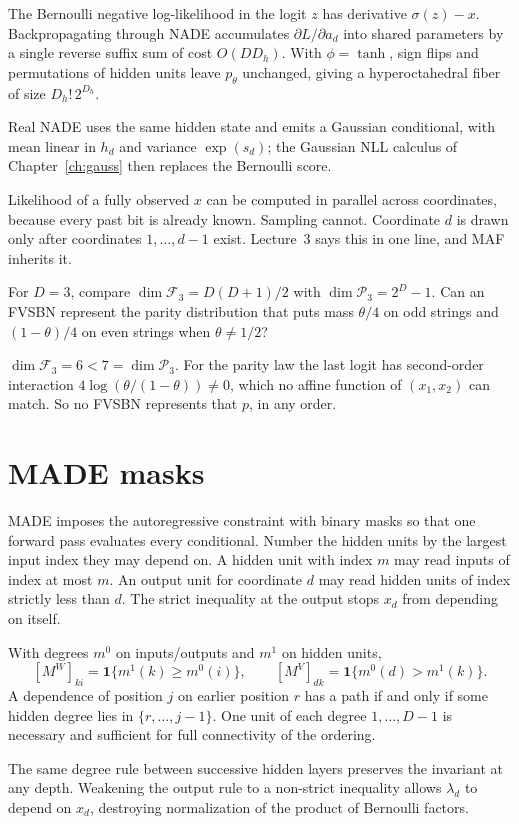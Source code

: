 The Bernoulli negative log-likelihood in the logit $z$ has derivative $\sigma(z)-x$. Backpropagating through NADE accumulates $\partial L/\partial a_d$ into shared parameters by a single reverse suffix sum of cost $O(D D_h)$. With $\phi=\tanh$, sign flips and permutations of hidden units leave $p_\theta$ unchanged, giving a hyperoctahedral fiber of size $D_h!\,2^{D_h}$.

Real NADE uses the same hidden state and emits a Gaussian conditional, with mean linear in $h_d$ and variance $\exp(s_d)$; the Gaussian NLL calculus of Chapter~\ref{ch:gauss} then replaces the Bernoulli score.

\begin{intbox}
Likelihood of a fully observed $x$ can be computed in parallel across coordinates, because every past bit is already known. Sampling cannot. Coordinate $d$ is drawn only after coordinates $1,\ldots,d-1$ exist. Lecture~3 says this in one line, and MAF inherits it.
\end{intbox}

\begin{practbox}
For $D=3$, compare $\dim\mathcal F_3=D(D+1)/2$ with $\dim\mathcal P_3=2^D-1$. Can an FVSBN represent the parity distribution that puts mass $\theta/4$ on odd strings and $(1-\theta)/4$ on even strings when $\theta\ne 1/2$?
\end{practbox}
\begin{solbox}
$\dim\mathcal F_3=6<7=\dim\mathcal P_3$. For the parity law the last logit has second-order interaction $4\log(\theta/(1-\theta))\ne 0$, which no affine function of $(x_1,x_2)$ can match. So no FVSBN represents that $p$, in any order.
\end{solbox}

\section{MADE masks}

MADE imposes the autoregressive constraint with binary masks so that one forward pass evaluates every conditional. Number the hidden units by the largest input index they may depend on. A hidden unit with index $m$ may read inputs of index at most $m$. An output unit for coordinate $d$ may read hidden units of index strictly less than $d$. The strict inequality at the output stops $x_d$ from depending on itself.

\begin{resultbox}
With degrees $m^0$ on inputs/outputs and $m^1$ on hidden units,
\[
[M^W]_{ki}=\mathbf 1\{m^1(k)\ge m^0(i)\},\qquad
[M^V]_{dk}=\mathbf 1\{m^0(d)>m^1(k)\}.
\]
A dependence of position $j$ on earlier position $r$ has a path if and only if some hidden degree lies in $\{r,\ldots,j-1\}$. One unit of each degree $1,\ldots,D-1$ is necessary and sufficient for full connectivity of the ordering.
\end{resultbox}
The same degree rule between successive hidden layers preserves the invariant at any depth. Weakening the output rule to a non-strict inequality allows $\lambda_d$ to depend on $x_d$, destroying normalization of the product of Bernoulli factors.

